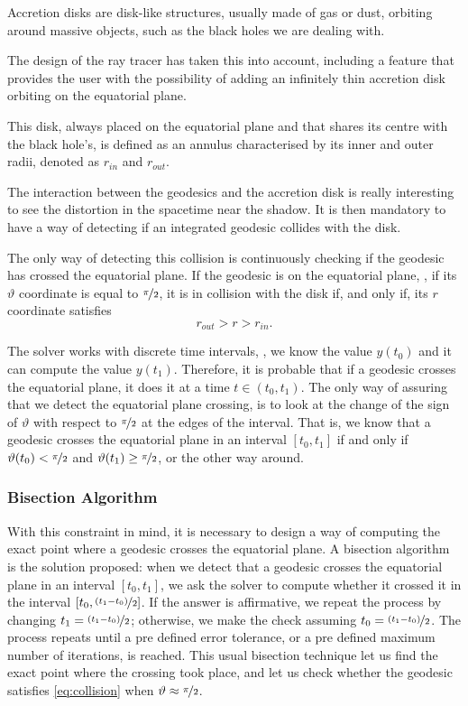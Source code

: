 Accretion disks are disk-like structures, usually made of gas or dust, orbiting around massive objects, such as the black holes we are dealing with.

The design of the ray tracer has taken this into account, including a feature that provides the user with the possibility of adding an infinitely thin accretion disk orbiting on the equatorial plane.

This disk, always placed on the equatorial plane and that shares its centre with the black hole's, is defined as an annulus characterised by its inner and outer radii, denoted as $r_{in}$ and $r_{out}$.

The interaction between the geodesics and the accretion disk is really interesting to see the distortion in the spacetime near the shadow. It is then mandatory to have a way of detecting if an integrated geodesic collides with the disk.

The only way of detecting this collision is continuously checking if the geodesic has crossed the equatorial plane. If the geodesic is on the equatorial plane, \ie, if its $\vartheta$ coordinate is equal to $\nicefrac{\pi}{2}$, it is in collision with the disk if, and only if, its $r$ coordinate satisfies
\begin{equation}
\label{eq:collision}
r_{out} > r > r_{in}.
\end{equation}

The solver works with discrete time intervals, \ie, we know the value $y(t_0)$ and it can compute the value $y(t_1)$. Therefore, it is probable that if a geodesic crosses the equatorial plane, it does it at a time $t \in (t_0, t_1)$. The only way of assuring that we detect the equatorial plane crossing, is to look at the change of the sign of $\vartheta$ with respect to $\nicefrac{\pi}{2}$ at the edges of the interval. That is, we know that a geodesic crosses the equatorial plane in an interval $[t_0, t_1]$ if and only if $\vartheta(t_0) < \nicefrac{\pi}{2}$ and $\vartheta(t_1) \geq \nicefrac{\pi}{2}$, or the other way around.

\subsubsection*{Bisection Algorithm}

With this constraint in mind, it is necessary to design a way of computing the exact point where a geodesic crosses the equatorial plane. A bisection algorithm is the solution proposed: when we detect that a geodesic crosses the equatorial plane in an interval $[t_0, t_1]$, we ask the solver to compute whether it crossed it in the interval $[t_0, \nicefrac{(t_1 - t_0)}{2}]$. If the answer is affirmative, we repeat the process by changing $t_1 = \nicefrac{(t_1 - t_0)}{2}$; otherwise, we make the check assuming $t_0 = \nicefrac{(t_1 - t_0)}{2}$. The process repeats until a pre defined error tolerance, or a pre defined maximum number of iterations, is reached. This usual bisection technique let us find the exact point where the crossing took place, and let us check whether the geodesic satisfies \autoref{eq:collision} when $\vartheta \approx \nicefrac{\pi}{2}$.

